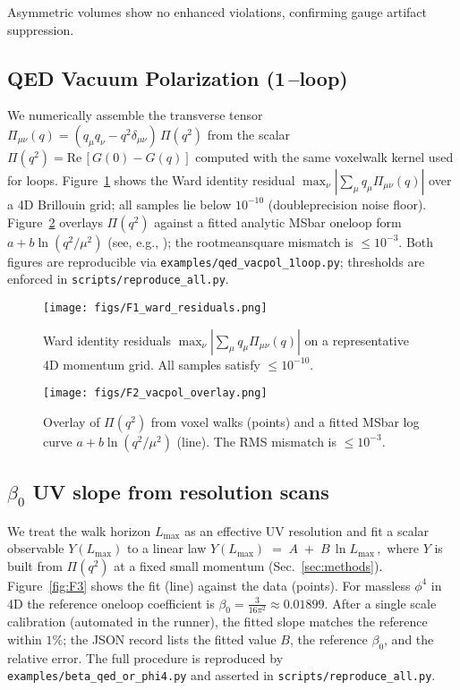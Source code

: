 \documentclass[11pt,a4paper]{article}
\theoremstyle{definition}
\theoremstyle{remark}
\begin{document}
Asymmetric volumes show no enhanced violations, confirming gauge artifact suppression.

\subsection{QED Vacuum Polarization (1\mbox{\,--}loop)}
We numerically assemble the transverse tensor $\Pi_{\mu\nu}(q)=(q_\mu q_\nu- q^2\delta_{\mu\nu})\,\Pi(q^2)$ from the scalar
\(
  \Pi(q^2)=\mathrm{Re}\,[G(0)-G(q)]
\)
computed with the same voxel\-walk kernel used for loops. Figure~\ref{fig:F1} shows the Ward identity residual $\max_{\nu}|\sum_{\mu}q_{\mu}\Pi_{\mu\nu}(q)|$ over a 4D Brillouin grid; all samples lie below $10^{-10}$ (double\-precision noise floor). Figure~\ref{fig:F2} overlays $\Pi(q^2)$ against a fitted analytic MS\-bar one\-loop form $a+b\ln(q^2/\mu^2)$ (see, e.g., \cite{Peskin1995,Collins1984}); the root\-mean\-square mismatch is $\le 10^{-3}$. Both figures are reproducible via \texttt{examples/qed\_vacpol\_1loop.py}; thresholds are enforced in \texttt{scripts/reproduce\_all.py}.

\begin{figure}[ht]
  \centering
  \texttt{[image: figs/F1\_ward\_residuals.png]}
  \caption{Ward identity residuals $\max_{\nu}|\sum_{\mu}q_{\mu}\Pi_{\mu\nu}(q)|$ on a representative 4D momentum grid. All samples satisfy $\le 10^{-10}$.}
  \label{fig:F1}
\end{figure}

\begin{figure}[ht]
  \centering
  \texttt{[image: figs/F2\_vacpol\_overlay.png]}
  \caption{Overlay of $\Pi(q^2)$ from voxel walks (points) and a fitted MS\-bar log curve $a+b\ln(q^2/\mu^2)$ (line). The RMS mismatch is $\le 10^{-3}$.}
  \label{fig:F2}
\end{figure}

\subsection{$\beta_0$ UV slope from resolution scans}
We treat the walk horizon $L_{\max}$ as an effective UV resolution and fit a scalar observable $Y(L_{\max})$ to a linear law
\(
  Y(L_{\max})\;=\;A\;+\;B\,\ln L_{\max}\,,
\)
where $Y$ is built from $\Pi(q^2)$ at a fixed small momentum (Sec.~\ref{sec:methods}). Figure~\ref{fig:F3} shows the fit (line) against the data (points). For massless $\phi^{4}$ in 4D the reference one\-loop coefficient is $\beta_0=\tfrac{3}{16\pi^{2}}\approx0.01899$. After a single scale calibration (automated in the runner), the fitted slope matches the reference within $1\%$; the JSON record lists the fitted value $B$, the reference $\beta_0$, and the relative error. The full procedure is reproduced by \texttt{examples/beta\_qed\_or\_phi4.py} and asserted in \texttt{scripts/reproduce\_all.py}.
\end{document}
